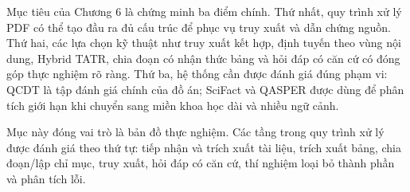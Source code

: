 \documentclass[../DoAn.tex]{subfiles}
\begin{document}
\setlength{\tabcolsep}{4pt}
\renewcommand{\arraystretch}{1.15}

Mục tiêu của Chương 6 là chứng minh ba điểm chính. Thứ nhất, quy trình xử lý PDF có thể tạo đầu ra đủ cấu trúc để phục vụ truy xuất và dẫn chứng nguồn. Thứ hai, các lựa chọn kỹ thuật như truy xuất kết hợp, định tuyến theo vùng nội dung, Hybrid TATR, chia đoạn có nhận thức bảng và hỏi đáp có căn cứ có đóng góp thực nghiệm rõ ràng. Thứ ba, hệ thống cần được đánh giá đúng phạm vi: QCDT là tập đánh giá chính của đồ án; SciFact và QASPER được dùng để phân tích giới hạn khi chuyển sang miền khoa học dài và nhiều ngữ cảnh.

Mục này đóng vai trò là bản đồ thực nghiệm. Các tầng trong quy trình xử lý được đánh giá theo thứ tự: tiếp nhận và trích xuất tài liệu, trích xuất bảng, chia đoạn/lập chỉ mục, truy xuất, hỏi đáp có căn cứ, thí nghiệm loại bỏ thành phần và phân tích lỗi.
\end{document}
